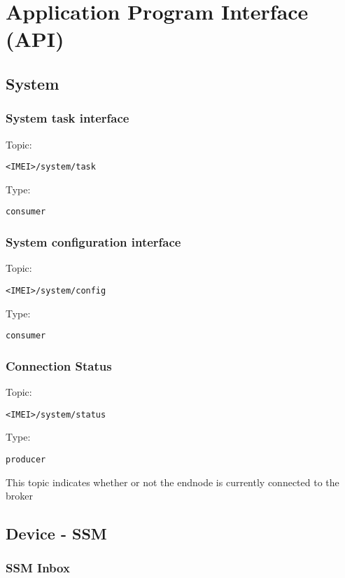 \section{Application Program Interface (API)}

\subsection{System}

\subsubsection{System task interface}

Topic:
\begin{lstlisting}<IMEI>/system/task\end{lstlisting}
Type:
\begin{lstlisting}consumer\end{lstlisting}
    
\subsubsection{System configuration interface}

Topic:
\begin{lstlisting}<IMEI>/system/config\end{lstlisting}
Type:
\begin{lstlisting}consumer\end{lstlisting}
    
\subsubsection{Connection Status}

Topic:
\begin{lstlisting}<IMEI>/system/status\end{lstlisting}
Type:
\begin{lstlisting}producer\end{lstlisting}
    
This topic indicates whether or not the endnode is currently connected to the broker


\subsection{Device - SSM}

\subsubsection{SSM Inbox}

